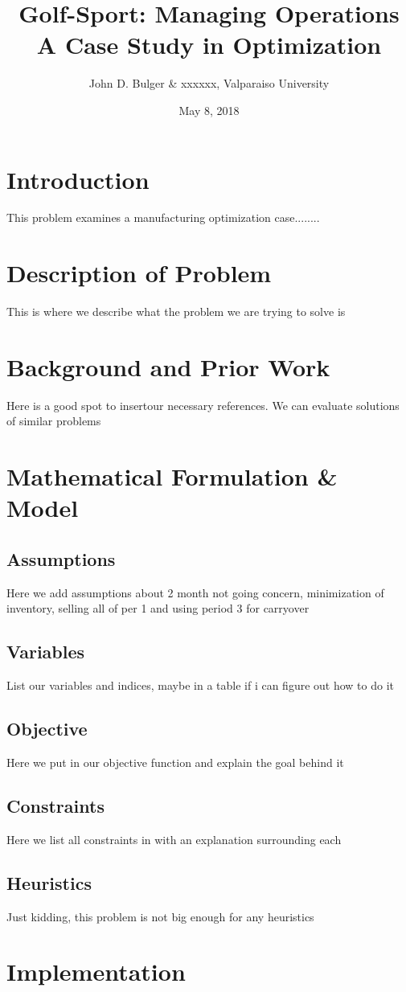 \documentclass{article}
\title{Golf-Sport:  Managing Operations \\ A Case Study in Optimization}
\date{May 8, 2018}
\author{John D. Bulger \& xxxxxx, Valparaiso University}
\begin{document}
	\maketitle
	\newpage
\section{Introduction}
This problem examines a manufacturing optimization case........
\section{Description of Problem}
This is where we describe what the problem we are trying to solve is
\section{Background and Prior Work}
Here is a good spot to insertour necessary references.  We can evaluate solutions of similar problems
\section{Mathematical Formulation \& Model}
\subsection{Assumptions}
Here we add assumptions about 2 month not going concern, minimization of inventory, selling all of per 1 and using period 3 for carryover
\subsection{Variables}
List our variables and indices, maybe in a table if i can figure out how to do it
\subsection{Objective}
Here we put in our objective function and explain the goal behind it
\subsection{Constraints}
Here we list all constraints in with an explanation surrounding each
\subsection{Heuristics}
Just kidding, this problem is not big enough for any heuristics
\section{Implementation}
\end{document}
